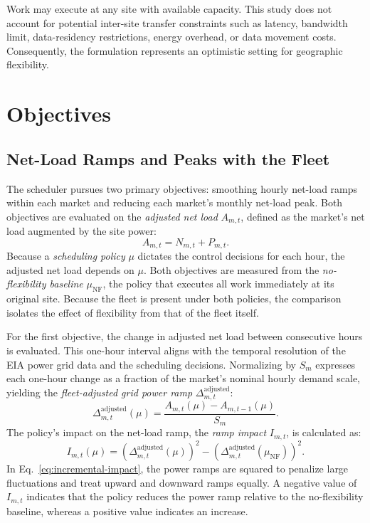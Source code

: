 \documentclass{UNCC-thesis}
\begin{document}
Work may execute at any site with available capacity. This study does not account for
potential inter-site transfer constraints such as latency, bandwidth limit,
data-residency restrictions, energy overhead, or data movement costs. Consequently,
the formulation represents an optimistic setting for geographic flexibility.

\section{Objectives}
\label{sec:problem-objectives}

\subsection{Net-Load Ramps and Peaks with the Fleet}
\label{subsec:problem-objective}

The scheduler pursues two primary objectives: smoothing hourly net-load ramps within
each market and reducing each market's monthly net-load peak. Both objectives are
evaluated on the \emph{adjusted net load} \(A_{m,t}\), defined as the market's
net load augmented by the site power:
\begin{equation}
  A_{m,t}
  =
  N_{m,t}+P_{m,t}.
  \label{eq:adjusted-net-load}
\end{equation}
Because a \emph{scheduling policy} \(\mu\) dictates the control decisions for each hour, the
adjusted net load depends on \(\mu\). Both objectives are measured from the
\emph{no-flexibility baseline} \(\mu_{\mathrm{NF}}\), the policy that executes all work
immediately at its original site. Because the fleet is present under both policies, the
comparison isolates the effect of flexibility from that of the fleet itself.

For the first objective, the change in adjusted net load between consecutive hours is
evaluated. This one-hour interval aligns with the temporal resolution of the EIA power
grid data and the scheduling decisions. Normalizing by \(S_m\) expresses each one-hour
change as a fraction of the market's nominal hourly demand scale, yielding the
\emph{fleet-adjusted grid power ramp} \(\Delta^{\mathrm{adjusted}}_{m,t}\):
\begin{equation}
  \Delta^{\mathrm{adjusted}}_{m,t}(\mu)
  =
  \frac{A_{m,t}(\mu)-A_{m,t-1}(\mu)}{S_m}.
  \label{eq:adjusted-ramp}
\end{equation}
The policy's impact on the net-load ramp, the \emph{ramp impact} \(I_{m,t}\), is calculated as:
\begin{equation}
  I_{m,t}(\mu)
  =
  \left(\Delta^{\mathrm{adjusted}}_{m,t}(\mu)\right)^2
  -
  \left(\Delta^{\mathrm{adjusted}}_{m,t}(\mu_{\mathrm{NF}})\right)^2.
  \label{eq:incremental-impact}
\end{equation}
In Eq.~\eqref{eq:incremental-impact}, the power ramps are squared to penalize large
fluctuations and treat upward and downward ramps equally. A negative value of
\(I_{m,t}\) indicates that the policy reduces the power ramp relative to the
no-flexibility baseline, whereas a positive value indicates an increase.
\end{document}
